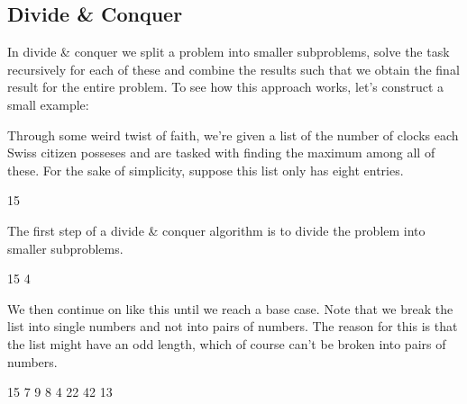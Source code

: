 \documentclass[main.tex]{subfiles}
\begin{document}
\pagebreak

\subsection{Divide \& Conquer} \label{Divide \& Conquer}
In divide \& conquer we split a problem into smaller subproblems, solve the task recursively for each of these and combine the results such that we obtain the final result for the entire problem. To see how this approach works, let's construct a small example:
\begin{example}
    Through some weird twist of faith, we're given a list of the number of clocks each Swiss citizen posseses and are tasked with finding the maximum among all of these. For the sake of simplicity, suppose this list only has eight entries. 
    \begin{center}
        15
    \end{center}
    The first step of a divide \& conquer algorithm is to divide the problem into smaller subproblems.
    \begin{center}
        \hspace*{\fill} 15 \hspace*{\fill} 4 \hspace*{\fill}
    \end{center}
    We then continue on like this until we reach a base case. Note that we break the list into single numbers and not into pairs of numbers. The reason for this is that the list might have an odd length, which of course can't be broken into pairs of numbers.
    \begin{center}
        \hspace*{\fill} 15 \hspace*{\fill} 7 \hspace*{\fill} 9 \hspace*{\fill} 8 \hspace*{\fill} 4 \hspace*{\fill} 22 \hspace*{\fill} 42 \hspace*{\fill} 13 \hspace*{\fill}
    \end{center}

\end{example}
\end{document}
